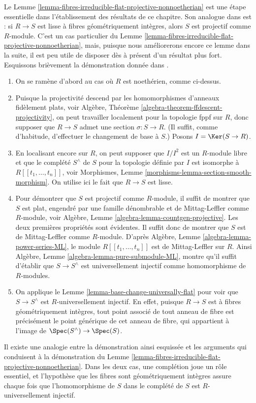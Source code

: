 \begin{remark}
\label{remark-how-in-RG}
Le Lemme \ref{lemma-fibres-irreducible-flat-projective-nonnoetherian}
est une étape essentielle dans l'établissement des résultats de ce chapitre. Son analogue
dans \cite{GruRay} est \cite[I Proposition 3.3.1]{GruRay} :
si $R \to S$ est lisse à fibres géométriquement intègres, alors $S$
est projectif comme $R$-module. C'est un cas particulier du
Lemme \ref{lemma-fibres-irreducible-flat-projective-nonnoetherian},
mais, puisque nous améliorerons encore ce lemme dans la suite, il est peu utile
de disposer dès à présent d'un résultat plus fort.
Esquissons brièvement la démonstration donnée dans \cite{GruRay}.
\begin{enumerate}
\item On se ramène d'abord au cas où $R$ est noethérien, comme ci-dessus.
\item Puisque la projectivité descend par les homomorphismes d'anneaux fidèlement plats, voir
Algèbre, Théorème \ref{algebra-theorem-ffdescent-projectivity},
on peut travailler localement pour la topologie fppf sur $R$, donc supposer
que $R \to S$ admet une section $\sigma : S \to R$. (Il suffit, comme d'habitude,
d'effectuer le changement de base à $S$.) Posons $I = \Ker(S \to R)$.
\item En localisant encore sur $R$, on peut supposer que $I/I^2$ est un
$R$-module libre et que le complété $S^\wedge$ de $S$ pour la topologie définie par $I$
est isomorphe à $R[[t_1, \ldots, t_n]]$, voir
Morphismes, Lemme \ref{morphisms-lemma-section-smooth-morphism}.
On utilise ici le fait que $R \to S$ est lisse.
\item Pour démontrer que $S$ est projectif comme $R$-module, il suffit de
montrer que $S$ est plat, engendré par une famille dénombrable et de Mittag-Leffler comme
$R$-module, voir
Algèbre, Lemme \ref{algebra-lemma-countgen-projective}.
Les deux premières propriétés sont évidentes. Il suffit donc de montrer que $S$
est de Mittag-Leffler comme $R$-module. D'après
Algèbre, Lemme \ref{algebra-lemma-power-series-ML},
le module $R[[t_1, \ldots, t_n]]$ est de Mittag-Leffler sur $R$. Ainsi
Algèbre, Lemme \ref{algebra-lemma-pure-submodule-ML},
montre qu'il suffit d'établir que
$S \to S^\wedge$ est universellement injectif comme homomorphisme de $R$-modules.
\item On applique
le Lemme \ref{lemma-base-change-universally-flat}
pour voir que $S \to S^\wedge$ est $R$-universellement injectif.
En effet, puisque $R \to S$ est à fibres géométriquement intègres, tout point associé
de tout anneau de fibre est précisément le point générique de cet anneau de fibre,
qui appartient à l'image de $\Spec(S^\wedge) \to \Spec(S)$.
\end{enumerate}
Il existe une analogie entre la démonstration ainsi esquissée et
les arguments qui conduisent à la démonstration du
Lemme \ref{lemma-fibres-irreducible-flat-projective-nonnoetherian}.
Dans les deux cas, une complétion joue un rôle essentiel, et l'hypothèse
que les fibres sont géométriquement intègres assure chaque fois que
l'homomorphisme de $S$ dans le complété de $S$ est $R$-universellement injectif.
\end{remark}
